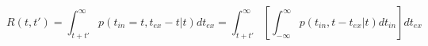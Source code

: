 \begin{equation}
R(t,t') = \int_{t+t'}^\infty p(t_{in}=t,t_{ex}-t|t) dt_{ex}  = \int_{t+t'}^\infty \left[ \int_{-\infty}^\infty p(t_{in},t-t_{ex}|t) dt_{in} \right]  dt_{ex}
\end{equation}